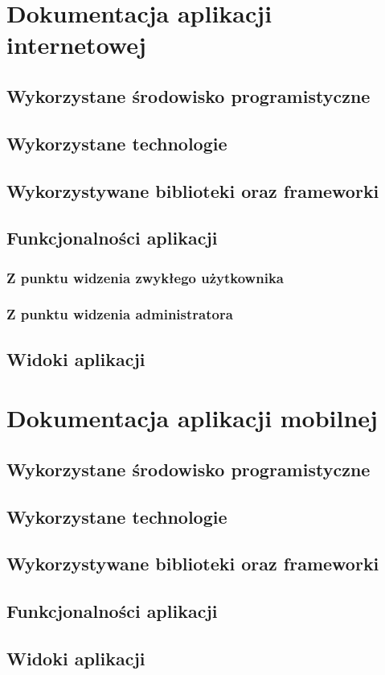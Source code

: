 \documentclass[a4paper]{article}
\begin{document}
\section{Dokumentacja aplikacji internetowej}

\subsection{Wykorzystane środowisko programistyczne}

\subsection{Wykorzystane technologie}

\subsection{Wykorzystywane biblioteki oraz frameworki}

\subsection{Funkcjonalności aplikacji}
\subsubsection{Z punktu widzenia zwykłego użytkownika}

\subsubsection{Z punktu widzenia administratora}

\subsection{Widoki aplikacji}

\section{Dokumentacja aplikacji mobilnej}

\subsection{Wykorzystane środowisko programistyczne}

\subsection{Wykorzystane technologie}

\subsection{Wykorzystywane biblioteki oraz frameworki}

\subsection{Funkcjonalności aplikacji}

\subsection{Widoki aplikacji}

\begin{lstlisting}[caption={Kod pliku Screen.c}, label={sc}]
 
\end{lstlisting}
\end{document}

